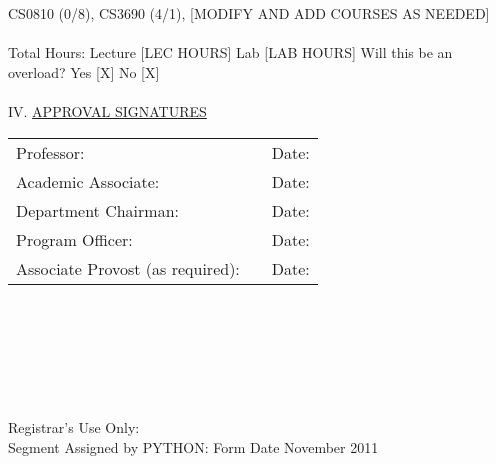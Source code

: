 \documentclass{article}
\begin{document}
CS0810 (0/8), CS3690 (4/1), [MODIFY AND ADD COURSES AS NEEDED] \\
\HRule \\
Total Hours: Lecture [LEC HOURS] Lab [LAB HOURS] \hfill Will this be an overload? Yes [X] No [X] \\
\\
IV. \underline{APPROVAL SIGNATURES} \\
\begin{tabular}{lll}
Professor: & \sigspace & Date: \datespace \\
Academic Associate: & \sigspace & Date: \datespace \\
Department Chairman: & \sigspace & Date: \datespace \\
Program Officer: & \sigspace & Date: \datespace \\
Associate Provost (as required): & \sigspace & Date: \datespace \\
\end{tabular}
\\
\\
\\
\\
\\
\HRuleThick \\
Registrar's Use Only: \\
Segment Assigned by PYTHON: \hfill Form Date November 2011\\
\end{document}

